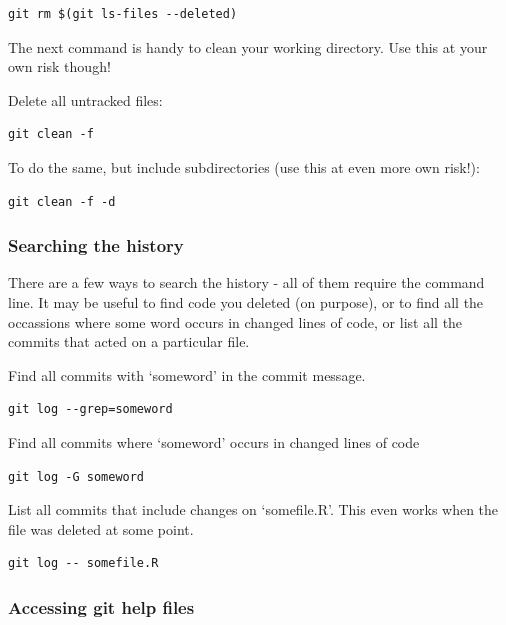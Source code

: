\documentclass[]{book}
\begin{document}
\begin{verbatim}
git rm $(git ls-files --deleted)
\end{verbatim}

The next command is handy to clean your working directory. Use this at your own risk though!

Delete all untracked files:

\begin{verbatim}
git clean -f
\end{verbatim}

To do the same, but include subdirectories (use this at even more own risk!):

\begin{verbatim}
git clean -f -d
\end{verbatim}

\hypertarget{searching-the-history}{%
\subsubsection{Searching the history}\label{searching-the-history}}

There are a few ways to search the history - all of them require the command line. It may be useful to find code you deleted (on purpose), or to find all the occassions where some word occurs in changed lines of code, or list all the commits that acted on a particular file.

Find all commits with `someword' in the commit message.

\begin{verbatim}
git log --grep=someword
\end{verbatim}

Find all commits where `someword' occurs in changed lines of code

\begin{verbatim}
git log -G someword
\end{verbatim}

List all commits that include changes on `somefile.R'. This even works when the file was deleted at some point.

\begin{verbatim}
git log -- somefile.R
\end{verbatim}

\hypertarget{accessing-git-help-files}{%
\subsubsection{Accessing git help files}\label{accessing-git-help-files}}
\end{document}
